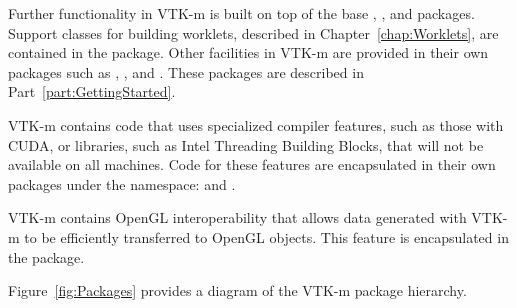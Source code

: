 Further functionality in VTK-m is built on top of the base \vtkm{},
\vtkmcont{}, and \vtkmexec{} packages. Support classes for building
worklets, described in Chapter~\ref{chap:Worklets}, are contained in the
\vtkmworklet{} package. Other facilities in VTK-m are provided in their own
packages such as \vtkmio{}, \vtkmfilter{}, and \vtkmrendering{}. These
packages are described in Part~\ref{part:GettingStarted}.

VTK-m contains code that uses specialized compiler features, such as those
with CUDA, or libraries, such as Intel Threading Building Blocks, that will
not be available on all machines. Code for these features are encapsulated
in their own packages under the \vtkmcont{} namespace: \vtkmcontcuda{} and
\vtkmconttbb{}.

VTK-m contains OpenGL interoperability 
 that allows data generated with VTK-m to be
efficiently transferred to OpenGL objects. This feature is encapsulated in
the \vtkmopengl{} package.

Figure~\ref{fig:Packages} provides a diagram of the VTK-m package hierarchy.

